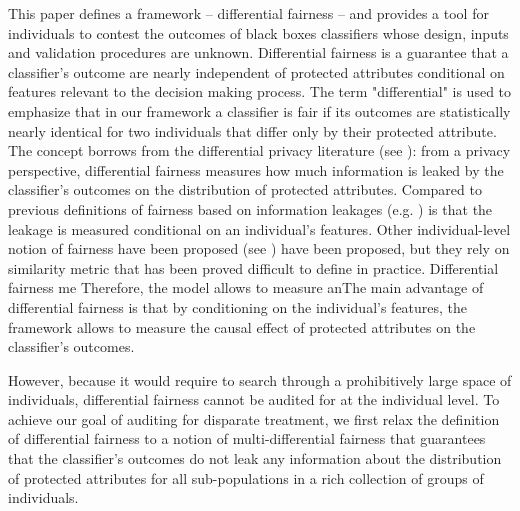\documentclass{article}
\begin{document}
\bigskip
 This paper defines a framework -- differential fairness -- and provides a tool for individuals to contest the outcomes of black boxes classifiers whose design, inputs and validation procedures are unknown. Differential fairness is a guarantee that a classifier's outcome are nearly independent of protected attributes conditional on features relevant to the decision making process. The term "differential" is used to emphasize that in our framework a classifier is fair if its outcomes are statistically nearly identical for two individuals that differ only by their protected attribute. The concept borrows from the differential privacy literature (see \cite{dwork2014algorithmic}): from a privacy perspective, differential fairness  measures how much information is leaked by the classifier's outcomes on the distribution of protected attributes. Compared to previous definitions of fairness based on information leakages (e.g. \cite{feldman2015certifying}) is that the leakage is measured conditional on an individual's features. Other individual-level notion of fairness have been proposed (see \cite{dwork2012fairness}) have been proposed, but they rely on similarity metric that has been proved difficult to define in practice. Differential fairness me Therefore, the model allows to measure anThe main advantage of differential fairness is that by conditioning on the individual's features, the framework allows to  measure the causal effect of protected attributes on the classifier's outcomes. 
 
 \bigskip
 However, because it would require to search through a prohibitively large space of individuals, differential fairness cannot be audited for at the individual level. To achieve our goal of auditing for disparate treatment, we first relax the definition of differential fairness to a notion of multi-differential fairness that guarantees that the classifier's outcomes do not leak any information about the distribution of protected attributes for all sub-populations in a rich collection of groups of individuals. 
 
\end{document}
